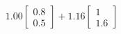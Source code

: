 \documentclass[preview]{standalone}
\begin{document}
\begin{align*}
1.00 \begin{bmatrix} 0.8 \\ 0.5 \end{bmatrix} + 1.16 \begin{bmatrix} 1 \\ 1.6 \end{bmatrix}
\end{align*}
\end{document}
